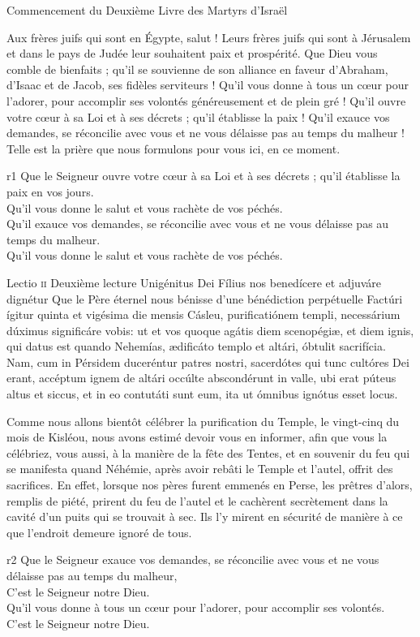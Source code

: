 \documentclass[twoside]{article}
\begin{document}
\begin{paracol}[1]{2}
{		Commencement du Deuxième Livre des Martyrs d'Israël
		
		Aux frères juifs qui sont en Égypte, salut ! Leurs frères juifs qui sont à Jérusalem et dans le pays de Judée leur souhaitent paix et prospérité.
		Que Dieu vous comble de bienfaits ; qu’il se souvienne de son alliance en faveur d’Abraham, d’Isaac et de Jacob, ses fidèles serviteurs !
		Qu’il vous donne à tous un cœur pour l’adorer, pour accomplir ses volontés généreusement et de plein gré !
		Qu’il ouvre votre cœur à sa Loi et à ses décrets ; qu’il établisse la paix !
		Qu’il exauce vos demandes, se réconcilie avec vous et ne vous délaisse pas au temps du malheur !
		Telle est la prière que nous formulons pour vous ici, en ce moment.
	}
	{r1}
	{\vfill
	\rr Que le Seigneur ouvre votre cœur à sa Loi et à ses décrets ; qu’il établisse la paix en vos jours.\\
	\GreSpecial{*} Qu'il vous donne le salut et vous rachète de vos péchés.\\
	\vv Qu’il exauce vos demandes, se réconcilie avec vous et ne vous délaisse pas au temps du malheur.\\
	\GreSpecial{*} Qu'il vous donne le salut et vous rachète de vos péchés.
	\vfill}

\lectioresponsorium
	{Lectio \textsc{ii}}
	{Deuxième lecture}
	{Unigénitus Dei Fílius nos benedícere et adjuváre dignétur}
	{Que le Père éternel nous bénisse d'une bénédiction perpétuelle}
	{
		Factúri ígitur quinta et vigésima die mensis Cásleu, purificatiónem templi, necessárium dúximus significáre vobis: ut et vos quoque agátis diem scenopégiæ, et diem ignis, qui datus est quando Nehemías, ædificáto templo et altári, óbtulit sacrifícia.
		Nam, cum in Pérsidem duceréntur patres nostri, sacerdótes qui tunc cultóres Dei erant, accéptum ignem de altári occúlte abscondérunt in valle, ubi erat púteus altus et siccus, et in eo contutáti sunt eum, ita ut ómnibus ignótus esset locus.
	}
	{	
	
		Comme nous allons bientôt célébrer la purification du Temple, le vingt-cinq du mois de Kisléou, nous avons estimé devoir vous en informer, 
		afin que vous la célébriez, vous aussi, à la manière de la fête des Tentes, et en souvenir du feu qui se manifesta quand Néhémie, 
		après avoir rebâti le Temple et l’autel, offrit des sacrifices.
		En effet, lorsque nos pères furent emmenés en Perse, les prêtres d’alors, remplis de piété,
		prirent du feu de l’autel et le cachèrent secrètement dans la cavité d’un puits qui se trouvait à sec.
		Ils l’y mirent en sécurité de manière à ce que l’endroit demeure ignoré de tous.
	}
	{r2}
	{\vfill
	\rr Que le Seigneur exauce vos demandes, se réconcilie avec vous et ne vous délaisse pas au temps du malheur,\\
	\GreSpecial{*} C'est le Seigneur notre Dieu.\\
	\vv Qu’il vous donne à tous un cœur pour l’adorer, pour accomplir ses volontés.\\
	\GreSpecial{*} C'est le Seigneur notre Dieu.}


\end{paracol}
\end{document}
